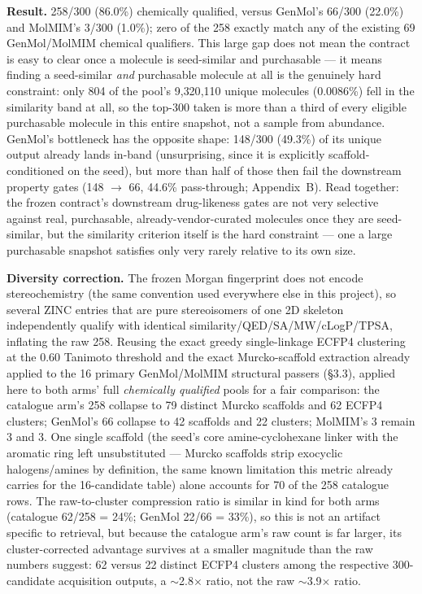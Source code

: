 \documentclass{article}
\begin{document}
\textbf{Result.} 258/300 (86.0\%) chemically qualified, versus GenMol's 66/300 (22.0\%) and MolMIM's 3/300 (1.0\%); zero of the 258 exactly match any of the existing 69 GenMol/MolMIM chemical qualifiers. This large gap does not mean the contract is easy to clear once a molecule is seed-similar and purchasable --- it means finding a seed-similar \emph{and} purchasable molecule at all is the genuinely hard constraint: only 804 of the pool's 9{,}320{,}110 unique molecules (0.0086\%) fell in the similarity band at all, so the top-300 taken is more than a third of every eligible purchasable molecule in this entire snapshot, not a sample from abundance. GenMol's bottleneck has the opposite shape: 148/300 (49.3\%) of its unique output already lands in-band (unsurprising, since it is explicitly scaffold-conditioned on the seed), but more than half of those then fail the downstream property gates (148 $\to$ 66, 44.6\% pass-through; Appendix~B). Read together: the frozen contract's downstream drug-likeness gates are not very selective against real, purchasable, already-vendor-curated molecules once they are seed-similar, but the similarity criterion itself is the hard constraint --- one a large purchasable snapshot satisfies only very rarely relative to its own size.

\textbf{Diversity correction.} The frozen Morgan fingerprint does not encode stereochemistry (the same convention used everywhere else in this project), so several ZINC entries that are pure stereoisomers of one 2D skeleton independently qualify with identical similarity/QED/SA/MW/cLogP/TPSA, inflating the raw 258. Reusing the exact greedy single-linkage ECFP4 clustering at the 0.60 Tanimoto threshold and the exact Murcko-scaffold extraction already applied to the 16 primary GenMol/MolMIM structural passers (\S3.3), applied here to both arms' full \emph{chemically qualified} pools for a fair comparison: the catalogue arm's 258 collapse to 79 distinct Murcko scaffolds and 62 ECFP4 clusters; GenMol's 66 collapse to 42 scaffolds and 22 clusters; MolMIM's 3 remain 3 and 3. One single scaffold (the seed's core amine-cyclohexane linker with the aromatic ring left unsubstituted --- Murcko scaffolds strip exocyclic halogens/amines by definition, the same known limitation this metric already carries for the 16-candidate table) alone accounts for 70 of the 258 catalogue rows. The raw-to-cluster compression ratio is similar in kind for both arms (catalogue 62/258 = 24\%; GenMol 22/66 = 33\%), so this is not an artifact specific to retrieval, but because the catalogue arm's raw count is far larger, its cluster-corrected advantage survives at a smaller magnitude than the raw numbers suggest: 62 versus 22 distinct ECFP4 clusters among the respective 300-candidate acquisition outputs, a $\sim$2.8$\times$ ratio, not the raw $\sim$3.9$\times$ ratio.
\end{document}
